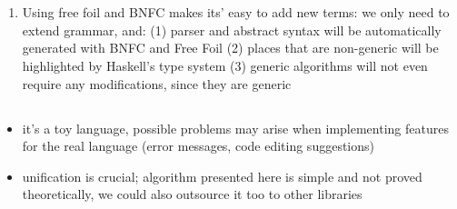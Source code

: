 \chapter{}
\label{chap:evaluation}



\section{}

\begin{enumerate}
  \item Using free foil and BNFC makes its' easy to add new terms: we only need to extend grammar, and: (1) parser and abstract syntax will be automatically generated with BNFC and Free Foil (2) places that are non-generic will be highlighted by Haskell's type system (3) generic algorithms will not even require any modifications, since they are generic
\end{enumerate}

\section{}

\begin{itemize}
  \item it's a toy language, possible problems may arise when implementing features for the real language (error messages, code editing suggestions)
  \item unification is crucial; algorithm presented here is simple and not proved theoretically, we could also outsource it too to other libraries
\end{itemize}
